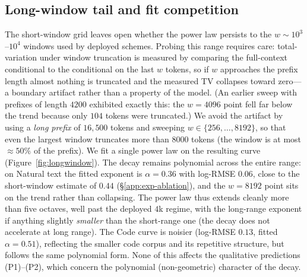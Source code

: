 \documentclass[11pt]{article}
\theoremstyle{plain}
\theoremstyle{definition}
\theoremstyle{remark}
\begin{document}
\subsection{Long-window tail and fit competition}
\label{app:exp-longwindow}
\label{sec:exp-longwindow}
The short-window grid leaves open whether the power law persists to
the $w \sim 10^3$--$10^4$ windows used by deployed schemes. Probing
this range requires care: total-variation under window truncation is
measured by comparing the full-context conditional to the conditional
on the last $w$ tokens, so if $w$ approaches the prefix length almost
nothing is truncated and the measured TV collapses toward zero---a
boundary artifact rather than a property of the model. (An earlier
sweep with prefixes of length $4200$ exhibited exactly this: the
$w = 4096$ point fell far below the trend because only $104$ tokens
were truncated.) We avoid the artifact by using a \emph{long prefix}
of $16{,}500$ tokens and sweeping $w \in \{256, \ldots, 8192\}$, so
that even the largest window truncates more than $8000$ tokens (the
window is at most $\approx 50\%$ of the prefix). We fit a single power
law on the resulting curve (Figure~\ref{fig:longwindow}). The decay
remains polynomial across the entire range: on Natural text the
fitted exponent is $\alpha = 0.36$ with log-RMSE $0.06$, close to the
short-window estimate of $0.44$ (\S\ref{app:exp-ablation}), and the
$w = 8192$ point sits on the trend rather than collapsing. The power
law thus extends cleanly more than five octaves, well past the
deployed $4$k regime, with the long-range exponent if anything
slightly \emph{smaller} than the short-range one (the decay does not
accelerate at long range). The Code curve is noisier
(log-RMSE $0.13$, fitted $\alpha = 0.51$), reflecting the smaller code
corpus and its repetitive structure, but follows the same polynomial
form. None of this affects the qualitative predictions (P1)--(P2),
which concern the polynomial (non-geometric) character of the decay.
\end{document}
